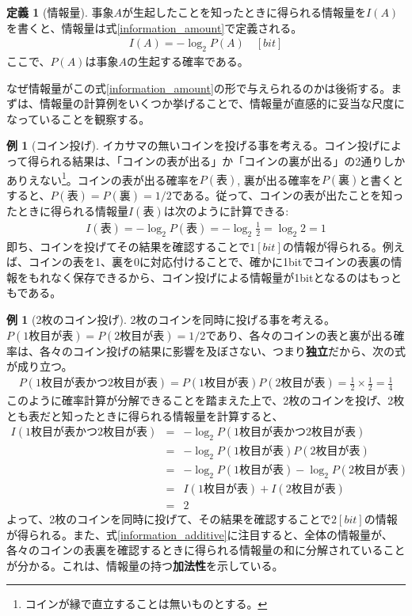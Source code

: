 \documentclass[uplatex,dvipdfmx,b5j,10pt]{jsbook}
\theoremstyle{definition}
\newtheorem{definition}[theorem]{定義}
\newtheorem{example}[theorem]{例}
\begin{document}
\begin{definition}[情報量]
  事象$A$が生起したことを知ったときに得られる情報量を$I(A)$を書くと、情報量は式\ref{information_amount}で定義される。
  \begin{eqnarray}
    I(A) = -\log_{2} P(A) \quad [bit] \label{information_amount}
  \end{eqnarray}
  ここで、$P(A)$は事象$A$の生起する確率である。
\end{definition}

なぜ情報量がこの式\ref{information_amount}の形で与えられるのかは後術する。まずは、情報量の計算例をいくつか挙げることで、情報量が直感的に妥当な尺度になっていることを観察する。

\begin{example}[コイン投げ]
  イカサマの無いコインを投げる事を考える。コイン投げによって得られる結果は、「コインの表が出る」か「コインの裏が出る」の2通りしかありえない\footnote{コインが縁で直立することは無いものとする。}。コインの表が出る確率を$P(表)$, 裏が出る確率を$P(裏)$と書くとすると、$P(表) = P(裏) = 1/2$である。従って、コインの表が出たことを知ったときに得られる情報量$I(表)$は次のように計算できる:
  \begin{eqnarray*}
    I(表) = - \log_{2} P(表) = -\log_{2} \frac{1}{2} = \log_{2} 2 = 1
  \end{eqnarray*}
  即ち、コインを投げてその結果を確認することで$1[bit]$の情報が得られる。例えば、コインの表を1、裏を0に対応付けることで、確かに1bitでコインの表裏の情報をもれなく保存できるから、コイン投げによる情報量が1bitとなるのはもっともである。
\end{example}

\begin{example}[2枚のコイン投げ] \label{information_example2}
  2枚のコインを同時に投げる事を考える。$P(1枚目が表) = P(2枚目が表) = 1/2$であり、各々のコインの表と裏が出る確率は、各々のコイン投げの結果に影響を及ぼさない、つまり\textbf{独立}だから、次の式が成り立つ。
  \begin{eqnarray*}
    P(1枚目が表かつ2枚目が表) = P(1枚目が表)P(2枚目が表) = \frac{1}{2} \times \frac{1}{2} = \frac{1}{4}
  \end{eqnarray*}
  このように確率計算が分解できることを踏まえた上で、2枚のコインを投げ、2枚とも表だと知ったときに得られる情報量を計算すると、
  \begin{eqnarray}
    I(1枚目が表かつ2枚目が表) &=& -\log_{2} P(1枚目が表かつ2枚目が表) \nonumber \\
    &=& -\log_{2} P(1枚目が表) P(2枚目が表) \nonumber \\
    &=& -\log_{2} P(1枚目が表) - \log_{2} P(2枚目が表) \nonumber \\
    &=& I(1枚目が表) + I(2枚目が表) \label{information_additive} \\
    &=& 2 \nonumber
  \end{eqnarray}
  よって、2枚のコインを同時に投げて、その結果を確認することで$2[bit]$の情報が得られる。また、式\ref{information_additive}に注目すると、全体の情報量が、各々のコインの表裏を確認するときに得られる情報量の和に分解されていることが分かる。これは、情報量の持つ\textbf{加法性}を示している。
\end{example}
\end{document}
